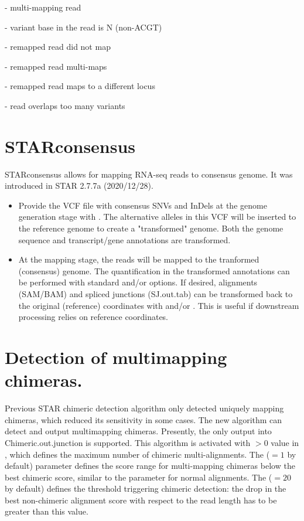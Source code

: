 \documentclass[12pt]{article}
\begin{document}
 - multi-mapping read

 - variant base in the read is N (non-ACGT)

 - remapped read did not map

 - remapped read multi-maps

 - remapped read maps to a different locus

 - read overlaps too many variants

\section{STARconsensus}
STARconsensus allows for mapping RNA-seq reads to consensus genome. It was introduced in STAR 2{.}7{.}7a (2020/12/28).

\begin{itemize}
\item
Provide the VCF file with consensus SNVs and InDels at the genome generation stage with      .
The alternative alleles in this VCF will be inserted to the reference genome to create a "transformed" genome.
Both the genome sequence and transcript/gene annotations are transformed.

\item
At the mapping stage, the reads will be mapped to the tranformed (consensus) genome.
The quantification in the transformed annotations can be performed with standard   and/or  options.
If desired, alignments (SAM/BAM) and spliced junctions (SJ.out.tab) can be transformed back to the original (reference) coordinates with   and/or .
This is useful if downstream processing relies on reference coordinates.
\end{itemize}

\section{Detection of multimapping chimeras.}
Previous STAR chimeric detection algorithm only detected uniquely mapping chimeras, which reduced its sensitivity in some cases.
The new algorithm can detect and output multimapping chimeras. Presently, the only output into Chimeric.out.junction is supported.
This algorithm is activated with $>0$ value in , which defines the maximum number of chimeric multi-alignments.
The  ($=1$ by default) parameter defines the score range for multi-mapping chimeras below the best chimeric score, similar to the  parameter for normal alignments.
The  ($=20$ by default) defines the threshold triggering chimeric detection: the drop in the best non-chimeric alignment score with respect to the read length has to be greater than this value.
\end{document}
